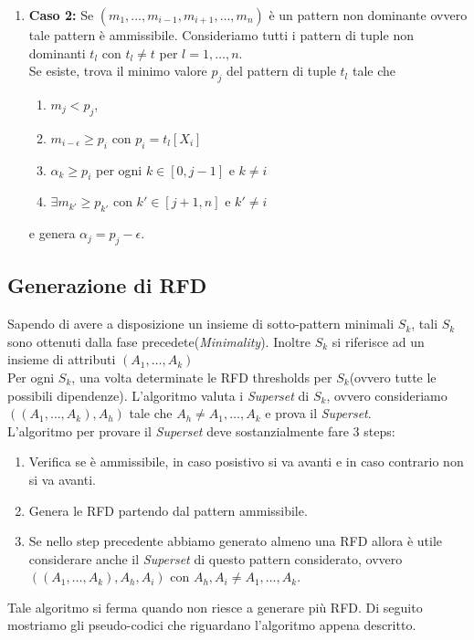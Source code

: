 \begin{itemize}
\begin{enumerate}
				\item  \textbf{Caso 2:} Se $(m_{1},\dots,m_{i-1},m_{i+1},\dots,m_{n})$ è un pattern non dominante ovvero tale pattern è ammissibile.
				Consideriamo tutti i pattern di tuple non dominanti $t_{l}$ con $t_{l}\neq t$ per $l=1,\dots,n$.\\
				Se esiste, trova il minimo valore $p_{j}$ del pattern di tuple $t_{l}$ tale che
				\begin{enumerate}
					\item  $m_{j}<p_{j}$, 
					\item $m_{i-\epsilon} \geq p_{i}$ con $p_{i}=t_{l}[X_{i}]$
					\item $\alpha_{k} \geq p_{i}$ per ogni $k \in [0,j-1]$ e $k \neq i$
					\item $\exists m_{k'} \geq p_{k'}$ con $k' \in [j+1,n]$ e $k' \neq i$
				\end{enumerate}  
				e genera $\alpha_{j}= p_{j} -\epsilon$.\\ 
			\end{enumerate}  		
\end{itemize}

\subsection{Generazione di RFD}
Sapendo di avere a disposizione un insieme di sotto-pattern minimali $S_{k}$, tali $S_{k}$ sono ottenuti dalla fase precedete(\textit{Minimality}). Inoltre $S_{k}$ si riferisce ad un insieme di attributi $(A_{1},\dots,A_{k})$ \\
Per ogni $S_{k}$, una volta determinate le RFD thresholds per $S_{k}$(ovvero tutte le possibili dipendenze). L'algoritmo valuta i \textit{Superset} di $S_{k}$, ovvero consideriamo $((A_{1},\dots,A_{k}),A_{h})$ tale che $A_{h} \neq A_{1},\dots,A_{k}$ e prova il \textit{Superset}.\\ 
L'algoritmo per provare il \textit{Superset} deve sostanzialmente fare 3 steps:
\begin{enumerate}
	\item Verifica se è ammissibile, in caso posistivo si va avanti e in caso contrario non si va avanti.
	\item Genera le RFD partendo dal pattern ammissibile. 
	\item Se nello step precedente abbiamo generato almeno una RFD  allora è utile considerare anche il \textit{Superset} di questo pattern considerato, ovvero $((A_{1},\dots,A_{k}),A_{h},A_{i})$ con $A_{h},A_{i} \neq A_{1},\dots,A_{k}$.
\end{enumerate}
Tale algoritmo si ferma quando non riesce a generare più RFD.
Di seguito mostriamo gli pseudo-codici che riguardano l'algoritmo appena descritto. 


